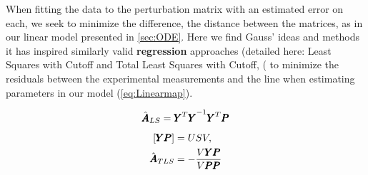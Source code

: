 When fitting the data to the perturbation matrix with an estimated error on each, we seek to minimize the difference, the distance between the matrices, as in our linear model presented in \cref{sec:ODE}. Here we find Gauss' ideas and methods it has inspired similarly valid \textbf{regression} approaches (detailed here: Least Squares with Cutoff and Total Least Squares with Cutoff, (%
to minimize the residuals between the experimental measurements and the line when estimating parameters in our model (\cref{eq:Linearmap}). %

  \begin{equation}
       \hat{{\pmb{A}}}_{LS}={{{\pmb{Y}}^T{\pmb{Y}}}^{-1} {\pmb{Y}}^T{\pmb{P}}}
 \label{eq:LSCO}
 \end{equation}
\begin{equation}
  \begin{aligned}
    \lbrack {\pmb{Y}} {\pmb{P}}\rbrack &= U S V , \\
    \hat{{\pmb{A}}}_{TLS} &= -\frac{V{\pmb{Y}}{\pmb{P}}}{V{\pmb{P}}{\pmb{P}}}
 \label{eq:TLSCO}
  \end{aligned}
 \end{equation}

